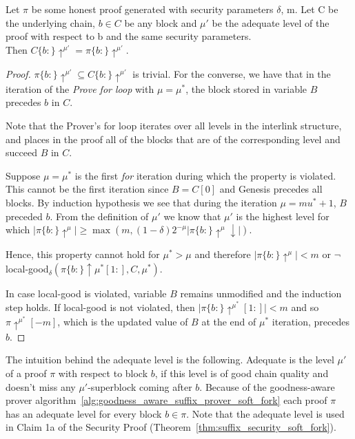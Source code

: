 \begin{lemma}
	Let $\pi$ be some honest proof generated with security
	parameters $\delta$, m. Let C be the underlying chain, $b \in C$ be any block
	and $\mu'$ be the adequate level of the proof with respect to b and the same
	security parameters.\\Then $C\{b:\}\uparrow^{\mu'} = \pi\{b:\}\uparrow^{\mu'}$.
	\label{lemm:complete_adequate}
\end{lemma}
\begin{proof}
	$ \pi\{b:\}\uparrow^{\mu'} \subseteq C\{b:\}\uparrow^{\mu'}$ is
	trivial. For the converse, we have that in the iteration of the \emph{Prove for
	loop}\cite{nipopows} with $\mu = \mu^*$, the block stored in variable $B$
	precedes $b$ in $C$.

	Note that the Prover's for loop iterates over all levels in the interlink structure,
	and places in the proof all of the blocks that are of the corresponding level and succeed $B$ in $C$.

	Suppose $\mu = \mu^*$ is the first \emph{for} iteration during which the property
	is violated. This cannot be the first iteration since $B = C[0]$ and Genesis
	precedes all blocks. By induction hypothesis we see that during the iteration
	$\mu = mu^* + 1$, $B$ preceded $b$. From the definition of $\mu'$ we know that
	$\mu'$ is the highest level for which $\vert \pi\{b:\}\uparrow^{\mu} \vert
	\geq \max( m, (1-\delta)2^{-\mu} \vert \pi\{b:\}\uparrow^{\mu}\downarrow \vert ) $.

	Hence, this property cannot hold for $\mu^* > \mu$ and therefore $\vert
	\pi\{b:\}\uparrow^{\mu} \vert < m$ or $\neg$local-good$_\delta(\pi\{b:
	\}\uparrow \mu^*[1:], C, \mu^*)$.

	In case local-good is violated, variable $B$ remains unmodified and the induction
	step holds. If local-good is not violated, then $ \vert \pi\{b:\} \uparrow^{\mu^*}[1:]
	\vert < m$ and so $\pi\uparrow^{\mu^*}[-m]$, which is the updated value of $B$ at the
	end of $\mu^*$ iteration, precedes $b$.
\end{proof}

The intuition behind the adequate level is the following. Adequate is the level $\mu'$ of a proof $\pi$ with respect to block $b$, if this level is of good chain quality and doesn't miss any $\mu'$-superblock coming after $b$. Because of the goodness-aware prover algorithm~\ref{alg:goodness_aware_suffix_prover_soft_fork} each proof $\pi$ has an adequate level for every block $b \in \pi$.
Note that the adequate level is used in Claim 1a of the Security Proof (Theorem~\ref{thm:suffix_security_soft_fork}).\\

